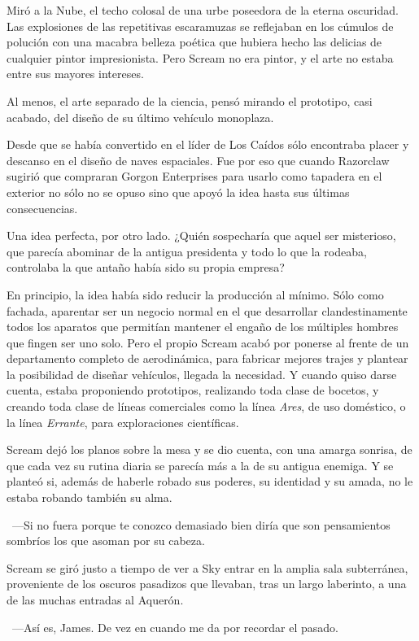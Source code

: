 Miró a la Nube, el techo colosal de una urbe poseedora de la eterna oscuridad. Las explosiones de las repetitivas escaramuzas se reflejaban en los cúmulos de polución con una macabra belleza poética que hubiera hecho las delicias de cualquier pintor impresionista. Pero Scream no era pintor, y el arte no estaba entre sus mayores intereses.

Al menos, el arte separado de la ciencia, pensó mirando el prototipo, casi acabado, del diseño de su último vehículo monoplaza.

Desde que se había convertido en el líder de Los Caídos sólo encontraba placer y descanso en el diseño de naves espaciales. Fue por eso que cuando Razorclaw sugirió que compraran Gorgon Enterprises para usarlo como tapadera en el exterior no sólo no se opuso sino que apoyó la idea hasta sus últimas consecuencias.

Una idea perfecta, por otro lado. ¿Quién sospecharía que aquel ser misterioso, que parecía abominar de la antigua presidenta y todo lo que la rodeaba, controlaba la que antaño había sido su propia empresa?

En principio, la idea había sido reducir la producción al mínimo. Sólo como fachada, aparentar ser un negocio normal en el que desarrollar clandestinamente todos los aparatos que permitían mantener el engaño de los múltiples hombres que fingen ser uno solo. Pero el propio Scream acabó por ponerse al frente de un departamento completo de aerodinámica, para fabricar mejores trajes y plantear la posibilidad de diseñar vehículos, llegada la necesidad. Y cuando quiso darse cuenta, estaba proponiendo prototipos, realizando toda clase de bocetos, y creando toda clase de líneas comerciales como la línea \emph{Ares}, de uso doméstico, o la línea \emph{Errante}, para exploraciones científicas.

Scream dejó los planos sobre la mesa y se dio cuenta, con una amarga sonrisa, de que cada vez su rutina diaria se parecía más a la de su antigua enemiga. Y se planteó si, además de haberle robado sus poderes, su identidad y su amada, no le estaba robando también su alma.

~---Si no fuera porque te conozco demasiado bien diría que son pensamientos sombríos los que asoman por su cabeza.

Scream se giró justo a tiempo de ver a Sky entrar en la amplia sala subterránea, proveniente de los oscuros pasadizos que llevaban, tras un largo laberinto, a una de las muchas entradas al Aquerón.

~---Así es, James. De vez en cuando me da por recordar el pasado.

